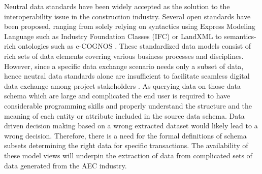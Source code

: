\documentclass[NewProceedings, InsideFigs]{ascelike} %
\begin{document}
Neutral data standards have been widely accepted as the solution to the interoperability issue in the construction industry. Several open standards have been proposed, ranging from solely relying on syntactics using Express Modeling Language such as Industry Foundation Classes (IFC) \cite{buildingsmart} or LandXML \cite{landxmlorg} to semantics-rich ontologies such as e-COGNOS \cite{Lima05}. These standardized data models consist of rich sets of data elements covering various business processes and disciplines. However, since a specific data exchange scenario needs only a subset of data, hence neutral data standards alone are insufficient to facilitate seamless digital data exchange among project stakeholders \cite{Froese03,east12}. As querying data on those data schema which are large and complicated the end user is required to have considerable programming skills and properly understand the structure and the meaning of each entity or attribute included in the source data schema. Data driven decision making based on a wrong extracted dataset would likely lead to a wrong decision. Therefore, there is a need for the formal definitions of schema subsets determining the right data for specific transactions. The availability of these model views will underpin the extraction of data from complicated sets of data generated from the AEC industry. 
\par
\end{document}
